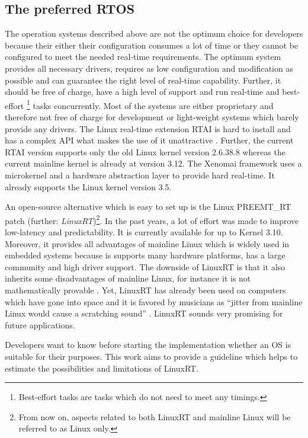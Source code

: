 \subsection{The preferred RTOS}
The operation systems described above are not the optimum choice for developers because their either their configuration consumes a lot of time or they cannot be configured to meet the needed real-time requirements.
The optimum system provides all necessary drivers, requires as low configuration and modification as possible and can guarantee the right level of real-time capability. 
Further, it should be free of charge, have a high level of support and run real-time and best-effort \footnote{Best-effort tasks are tasks which do not need to meet any timings.} tasks concurrently.
Most of the systems are either proprietary and therefore not free of charge for development or light-weight systems which barely provide any drivers.
The Linux real-time extension \ac{RTAI} is hard to install and has a complex \ac{API} what makes the use of it unattractive \cite{mitschang:heulfrvr}.
Further, the current \ac{RTAI} version supports only the old Linux kernel version 2.6.38.8 \cite{rtai} whereas the current mainline kernel is already at version 3.12. 
The Xenomai framework uses a microkernel and a hardware abstraction layer to provide hard real-time. 
It already supports the Linux kernel version 3.5.
\par
An open-source alternative which is easy to set up is the Linux PREEMT\_RT patch (further: \textit{LinuxRT})\footnote{From now on, aspects related to both LinuxRT and mainline Linux will be referred to as Linux only.}.
In the past years, a lot of effort was made to improve low-latency and predictability.
It is currently available for up to Kernel 3.10.
Moreover, it provides all advantages of mainline Linux which is widely used in embedded systems because is supports many hardware platforms, has a large community and high driver support.
The downside of LinuxRT is that it also inherits some disadvantages of mainline Linux, for instance it is not mathematically provable \cite{clark:itrtlfed}.
Yet, LinuxRT has already been used on computers which have gone into space and it is favored by musicians as ``jitter from mainline Linux would cause a scratching sound'' \cite{clark:itrtlfed}.
LinuxRT sounds very promising for future applications.
\par
Developers want to know before starting the implementation whether an \ac{OS} is suitable for their purposes.
This work aims to provide a guideline which helps to estimate the possibilities and limitations of LinuxRT. 
